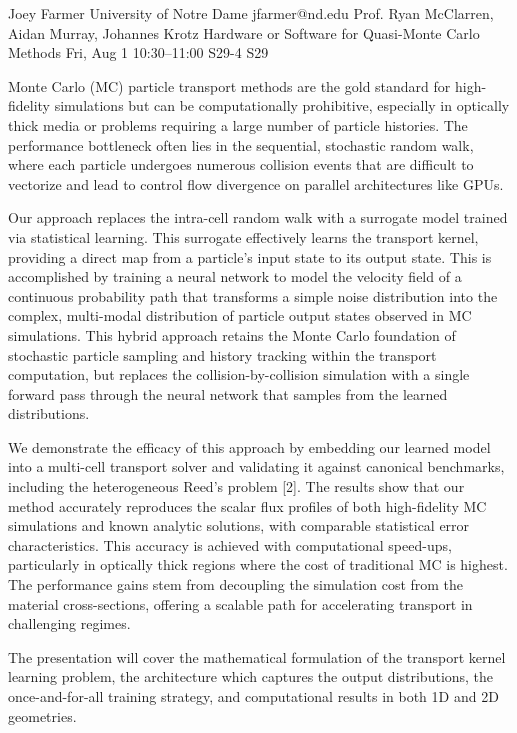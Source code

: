 \begin{talk}
  {Joey Farmer}%
  {University of Notre Dame}%
  {jfarmer@nd.edu}%
  {Prof. Ryan McClarren, Aidan Murray, Johannes Krotz}%
  {Hardware or Software for Quasi-Monte Carlo Methods}%
  {}%
  {Fri, Aug 1 10:30–11:00}%
  {S29-4}%
  {S29}%

Monte Carlo (MC) particle transport methods are the gold standard for high-fidelity simulations but can be computationally prohibitive, especially in optically thick media or problems requiring a large number of particle histories. The performance bottleneck often lies in the sequential, stochastic random walk, where each particle undergoes numerous collision events that are difficult to vectorize and lead to control flow divergence on parallel architectures like GPUs.

Our approach replaces the intra-cell random walk with a surrogate model trained via statistical learning. This surrogate effectively learns the transport kernel, providing a direct map from a particle's input state to its output state. This is accomplished by training a neural network to model the velocity field of a continuous probability path that transforms a simple noise distribution into the complex, multi-modal distribution of particle output states observed in MC simulations. This hybrid approach retains the Monte Carlo foundation of stochastic particle sampling and history tracking within the transport computation, but replaces the collision-by-collision simulation with a single forward pass through the neural network that samples from the learned distributions.

We demonstrate the efficacy of this approach by embedding our learned model into a multi-cell transport solver and validating it against canonical benchmarks, including the heterogeneous Reed's problem [2]. The results show that our method accurately reproduces the scalar flux profiles of both high-fidelity MC simulations and known analytic solutions, with comparable statistical error characteristics. This accuracy is achieved with  computational speed-ups, particularly in optically thick regions where the cost of traditional MC is highest. The performance gains stem from decoupling the simulation cost from the material cross-sections, offering a scalable path for accelerating transport in challenging regimes. 

The presentation will cover the mathematical formulation of the transport kernel learning problem, the architecture which captures the output distributions, the once-and-for-all training strategy, and computational  results in both 1D and 2D geometries.



\end{talk}
